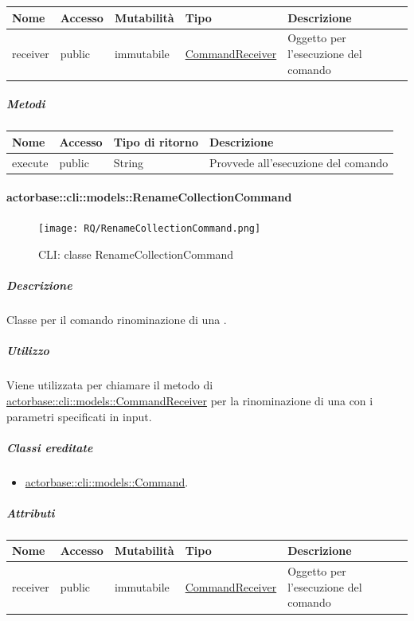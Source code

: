 \documentclass{scalatekids-article}
\begin{document}
\begin{tabular}{| p{1cm} | p{1.5cm} | p{2cm} | p{4cm} | p{8.5cm} |}
  \hline
  Nome & Accesso & Mutabilità & Tipo & Descrizione\\
  \hline
  receiver & public & immutabile & \hyperref[sec:actorbase::cli::models::CommandReceiver]{CommandReceiver} & Oggetto per l'esecuzione del comando\\
  \hline
\end{tabular}

\subparagraph{Metodi}

\begin{tabular}{| l | l | l | l |}
  \hline
  Nome & Accesso & Tipo di ritorno & Descrizione\\
  \hline
  execute & public & String & Provvede all'esecuzione del comando\\
  \hline
\end{tabular}

\paragraph{actorbase::cli::models::RenameCollectionCommand}
\label{sec:actorbase::cli::models::RenameCollectionCommand}

\begin{figure}[H]
  \begin{center}
    \texttt{[image: RQ/RenameCollectionCommand.png]}
    \caption{CLI: classe RenameCollectionCommand}
  \end{center}
\end{figure}

\subparagraph{Descrizione}

Classe per il comando rinominazione di una .

\subparagraph{Utilizzo}

Viene utilizzata per chiamare il metodo di \hyperref[sec:actorbase::cli::models::CommandReceiver]{actorbase::cli::models::CommandReceiver} per la rinominazione di una  con i parametri specificati in input.

\subparagraph{Classi ereditate}

\begin{itemize}
\item \hyperref[sec:actorbase::cli::models::Command]{actorbase::cli::models::Command}.
\end{itemize}

\subparagraph{Attributi}

\begin{tabular}{| p{1cm} | p{1.5cm} | p{2cm} | p{4cm} | p{8.5cm} |}
  \hline
  Nome & Accesso & Mutabilità & Tipo & Descrizione\\
  \hline
  receiver & public & immutabile & \hyperref[sec:actorbase::cli::models::CommandReceiver]{CommandReceiver} & Oggetto per l'esecuzione del comando\\
  \hline
\end{tabular}
\end{document}
